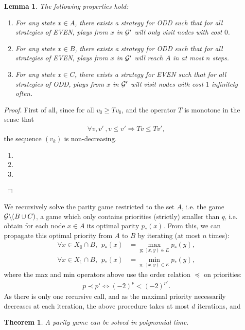 \documentclass{article}
\newtheorem{theorem}{Theorem}
\newtheorem{lemma}{Lemma}
\def\G{{\cal G}}
\begin{document}
\begin{lemma}
  The following properties hold:
  \begin{enumerate}
  \item For any state $x \in A$, there exists a strategy for ODD such that for all strategies of EVEN, plays from $x$ in $\G'$ will only visit nodes with cost $0$.
  \item For any state $x \in B$, there exists a strategy for ODD such that for all strategies of EVEN, plays from $x$ in $\G'$ will reach $A$ in at most $n$ steps. 
  \item For any state $x \in C$, there exists a strategy for EVEN such that for all strategies of ODD, plays from $x$ in $\G'$ will visit nodes with cost $1$ infinitely often.
  \end{enumerate}
\end{lemma}
%
\begin{proof}
  First of all, since for all $v_0 \ge T v_0$, and the operator $T$ is monotone in the sense that
  \begin{align}
    \forall v, v'~, v \le v' \Longrightarrow T v \le T v',
  \end{align}
  the sequence $(v_k)$ is non-decreasing.
  \begin{enumerate}
  \item
  \item
  \item 
  \end{enumerate}
\end{proof}
%
We recursively solve the parity game restricted to the set $A$, i.e. the game $\G \backslash (B \cup C)$, a game which only contains priorities (strictly) smaller than $q$, i.e. obtain for each node $x \in A$ its optimal parity $p_*(x)$. From this, we can propagate this optimal priority from $A$ to $B$ by iterating (at most $n$ times):
\begin{align}
  \forall x \in X_0 \cap B, ~~ p_*(x) &= \max_{y;(x,y)\in E} p_*(y), \\
  \forall x \in X_1 \cap B, ~~ p_*(x) &= \min_{y;(x,y)\in E} p_*(y),
\end{align}
where the max and min operators above use the order relation $\preceq$ on priorities:
\begin{align}
  p \prec p' \Leftrightarrow (-2)^{p}<(-2)^{p'}.  
\end{align}
As there is only one recursive call, and as the maximal priority necessarily decreases at each iteration, the above procedure takes at most $d$ iterations, and
\begin{theorem}
A parity game can be solved in polynomial time.
\end{theorem}



 
\end{document}

